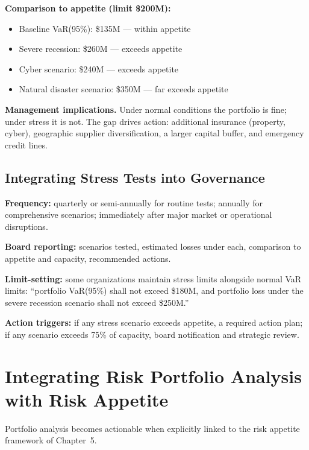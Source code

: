 \documentclass[11pt,openany]{book}
\providecommand{\tightlist}{\setlength{\itemsep}{0pt}\setlength{\parskip}{0pt}}
\begin{document}
\textbf{Comparison to appetite (limit \$200M):}
\begin{itemize}\tightlist
  \item Baseline VaR(95\%): \$135M --- within appetite
  \item Severe recession: \$260M --- exceeds appetite
  \item Cyber scenario: \$240M --- exceeds appetite
  \item Natural disaster scenario: \$350M --- far exceeds appetite
\end{itemize}

\textbf{Management implications.} Under normal conditions the portfolio is
fine; under stress it is not. The gap drives action: additional insurance
(property, cyber), geographic supplier diversification, a larger capital
buffer, and emergency credit lines.

\subsection{Integrating Stress Tests into Governance}
\label{subsec:stress-test-governance}

\textbf{Frequency:} quarterly or semi-annually for routine tests; annually for
comprehensive scenarios; immediately after major market or operational
disruptions.

\textbf{Board reporting:} scenarios tested, estimated losses under each,
comparison to appetite and capacity, recommended actions.

\textbf{Limit-setting:} some organizations maintain stress limits alongside
normal VaR limits: ``portfolio VaR(95\%) shall not exceed \$180M, and
portfolio loss under the severe recession scenario shall not exceed \$250M.''

\textbf{Action triggers:} if any stress scenario exceeds appetite, a required
action plan; if any scenario exceeds 75\% of capacity, board notification and
strategic review.

\section{Integrating Risk Portfolio Analysis with Risk Appetite}
\label{sec:integrating-appetite}

Portfolio analysis becomes actionable when explicitly linked to the risk
appetite framework of Chapter~5.
\end{document}
